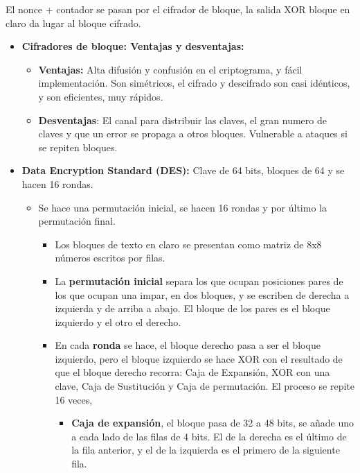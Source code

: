 \documentclass[12pt, twoside, openright]{report} %
\begin{document}
  El nonce + contador se pasan por el cifrador de bloque, la salida XOR
  bloque en claro da lugar al bloque cifrado.
\pagebreak
  \begin{itemize}
  \item \textbf{Cifradores de bloque: Ventajas y desventajas:}
    

    \begin{itemize}
    \item \textbf{Ventajas:} Alta difusión y confusión en el criptograma, y
      fácil implementación. Son simétricos, el cifrado y descifrado son
      casi idénticos, y son eficientes, muy rápidos.
      
    \item \textbf{Desventajas}: El canal para distribuir las claves, el gran
      numero de claves y que un error se propaga a otros bloques.
      Vulnerable a ataques si se repiten bloques.
      
    \end{itemize}
  \item \textbf{Data Encryption Standard (DES):} Clave de 64 bits, bloques
    de 64 y se hacen 16 rondas.
    

    \begin{itemize}
    \item Se hace una permutación inicial, se hacen 16 rondas y por último
      la permutación final.
      

      \begin{itemize}
      \item Los bloques de texto en claro se presentan como matriz de 8x8
        números escritos por filas.
        
      \item La \textbf{permutación inicial} separa los que ocupan posiciones
        pares de los que ocupan una impar, en dos bloques, y se escriben
        de derecha a izquierda y de arriba a abajo. El bloque de los
        pares es el bloque izquierdo y el otro el derecho.
        
      \item En cada \textbf{ronda} se hace, el bloque derecho pasa a ser el
        bloque izquierdo, pero el bloque izquierdo se hace XOR con el
        resultado de que el bloque derecho recorra: Caja de Expansión,
        XOR con una clave, Caja de Sustitución y Caja de permutación. El
        proceso se repite 16 veces,
        

        \begin{itemize}
        \item \textbf{Caja de expansión}, el bloque pasa de 32 a 48 bits, se
          añade uno a cada lado de las filas de 4 bits. El de la derecha
          es el último de la fila anterior, y el de la izquierda es el
          primero de la siguiente fila.
          

\end{itemize}
\end{itemize}
\end{itemize}
\end{itemize}
\end{document}
